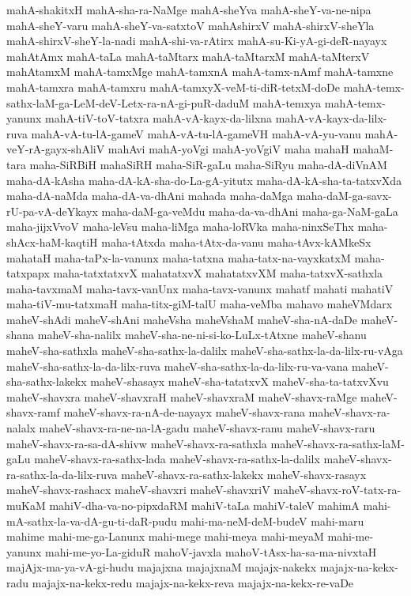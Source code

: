 {mahA-shakitxH
mahA-sha-ra-NaMge
mahA-sheYva
mahA-sheY-va-ne-nipa
mahA-sheY-varu
mahA-sheY-va-satxtoV
mahAshirxV
mahA-shirxV-sheYla
mahA-shirxV-sheY-la-nadi
mahA-shi-va-rAtirx
mahA-su-Ki-yA-gi-deR-nayayx
mahAtAmx
mahA-taLa
mahA-taMtarx
mahA-taMtarxM
mahA-taMterxV
mahAtamxM
mahA-tamxMge
mahA-tamxnA
mahA-tamx-nAmf
mahA-tamxne
mahA-tamxra
mahA-tamxru
mahA-tamxyX-veM-ti-diR-tetxM-doDe
mahA-temx-sathx-laM-ga-LeM-deV-Letx-ra-nA-gi-puR-daduM
mahA-temxya
mahA-temx-yanunx
mahA-tiV-toV-tatxra
mahA-vA-kayx-da-lilxna
mahA-vA-kayx-da-lilx-ruva
mahA-vA-tu-lA-gameV
mahA-vA-tu-lA-gameVH
mahA-vA-yu-vanu
mahA-veY-rA-gayx-shAliV
mahAvi
mahA-yoVgi
mahA-yoVgiV
maha
mahaH
mahaM-tara
maha-SiRBiH
mahaSiRH
maha-SiR-gaLu
maha-SiRyu
maha-dA-diVnAM
maha-dA-kAsha
maha-dA-kA-sha-do-La-gA-yitutx
maha-dA-kA-sha-ta-tatxvXda
maha-dA-naMda
maha-dA-va-dhAni
mahada
maha-daMga
maha-daM-ga-savx-rU-pa-vA-deYkayx
maha-daM-ga-veMdu
maha-da-va-dhAni
maha-ga-NaM-gaLa
maha-jijxVvoV
maha-leVsu
maha-liMga
maha-loRVka
maha-ninxSeThx
maha-shAcx-haM-kaqtiH
maha-tAtxda
maha-tAtx-da-vanu
maha-tAvx-kAMkeSx
mahataH
maha-taPx-la-vanunx
maha-tatxna
maha-tatx-na-vayxkatxM
maha-tatxpapx
maha-tatxtatxvX
mahatatxvX
mahatatxvXM
maha-tatxvX-sathxla
maha-tavxmaM
maha-tavx-vanUnx
maha-tavx-vanunx
mahatf
mahati
mahatiV
maha-tiV-mu-tatxmaH
maha-titx-giM-talU
maha-veMba
mahavo
maheVMdarx
maheV-shAdi
maheV-shAni
maheVsha
maheVshaM
maheV-sha-nA-daDe
maheV-shana
maheV-sha-nalilx
maheV-sha-ne-ni-si-ko-LuLx-tAtxne
maheV-shanu
maheV-sha-sathxla
maheV-sha-sathx-la-dalilx
maheV-sha-sathx-la-da-lilx-ru-vAga
maheV-sha-sathx-la-da-lilx-ruva
maheV-sha-sathx-la-da-lilx-ru-va-vana
maheV-sha-sathx-lakekx
maheV-shasayx
maheV-sha-tatatxvX
maheV-sha-ta-tatxvXvu
maheV-shavxra
maheV-shavxraH
maheV-shavxraM
maheV-shavx-raMge
maheV-shavx-ramf
maheV-shavx-ra-nA-de-nayayx
maheV-shavx-rana
maheV-shavx-ra-nalalx
maheV-shavx-ra-ne-na-lA-gadu
maheV-shavx-ranu
maheV-shavx-raru
maheV-shavx-ra-sa-dA-shivw
maheV-shavx-ra-sathxla
maheV-shavx-ra-sathx-laM-gaLu
maheV-shavx-ra-sathx-lada
maheV-shavx-ra-sathx-la-dalilx
maheV-shavx-ra-sathx-la-da-lilx-ruva
maheV-shavx-ra-sathx-lakekx
maheV-shavx-rasayx
maheV-shavx-rashacx
maheV-shavxri
maheV-shavxriV
maheV-shavx-roV-tatx-ra-muKaM
mahiV-dha-va-no-pipxdaRM
mahiV-taLa
mahiV-taleV
mahimA
mahi-mA-sathx-la-va-dA-gu-ti-daR-pudu
mahi-ma-neM-deM-budeV
mahi-maru
mahime
mahi-me-ga-Lanunx
mahi-mege
mahi-meya
mahi-meyaM
mahi-me-yanunx
mahi-me-yo-La-giduR
mahoV-javxla
mahoV-tAsx-ha-sa-ma-nivxtaH
majAjx-ma-ya-vA-gi-hudu
majajxna
majajxnaM
majajx-nakekx
majajx-na-kekx-radu
majajx-na-kekx-redu
majajx-na-kekx-reva
majajx-na-kekx-re-vaDe
}
